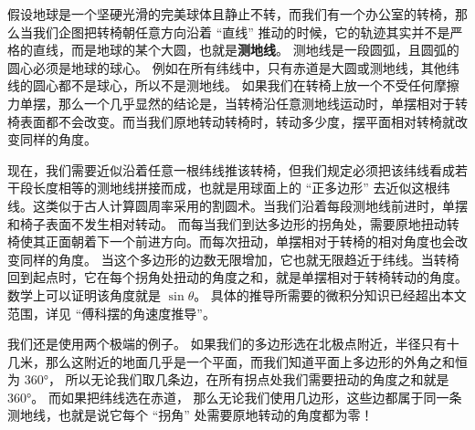 假设地球是一个坚硬光滑的完美球体且静止不转，而我们有一个办公室的转椅，那么当我们企图把转椅朝任意方向沿着 “直线” 推动的时候，它的轨迹其实并不是严格的直线，而是地球的某个大圆，也就是\textbf{测地线}。 测地线是一段圆弧，且圆弧的圆心必须是地球的球心。 例如在所有纬线中，只有赤道是大圆或测地线，其他纬线的圆心都不是球心，所以不是测地线。 如果我们在转椅上放一个不受任何摩擦力单摆，那么一个几乎显然的结论是，当转椅沿任意测地线运动时，单摆相对于转椅表面都不会改变。而当我们原地转动转椅时，转动多少度，摆平面相对转椅就改变同样的角度。

现在，我们需要近似沿着任意一根纬线推该转椅，但我们规定必须把该纬线看成若干段长度相等的测地线拼接而成，也就是用球面上的 “正多边形” 去近似这根纬线。这类似于古人计算圆周率采用的割圆术。当我们沿着每段测地线前进时，单摆和椅子表面不发生相对转动。 而每当我们到达多边形的拐角处，需要原地扭动转椅使其正面朝着下一个前进方向。而每次扭动，单摆相对于转椅的相对角度也会改变同样的角度。 当这个多边形的边数无限增加，它也就无限趋近于纬线。当转椅回到起点时，它在每个拐角处扭动的角度之和，就是单摆相对于转椅转动的角度。 数学上可以证明该角度就是 $\sin\theta$。 具体的推导所需要的微积分知识已经超出本文范围，详见 “傅科摆的角速度推导”。

我们还是使用两个极端的例子。 如果我们的多边形选在北极点附近，半径只有十几米，那么这附近的地面几乎是一个平面，而我们知道平面上多边形的外角之和恒为 360°， 所以无论我们取几条边，在所有拐点处我们需要扭动的角度之和就是 360°。 而如果把纬线选在赤道， 那么无论我们使用几边形，这些边都属于同一条测地线，也就是说它每个 “拐角” 处需要原地转动的角度都为零！
